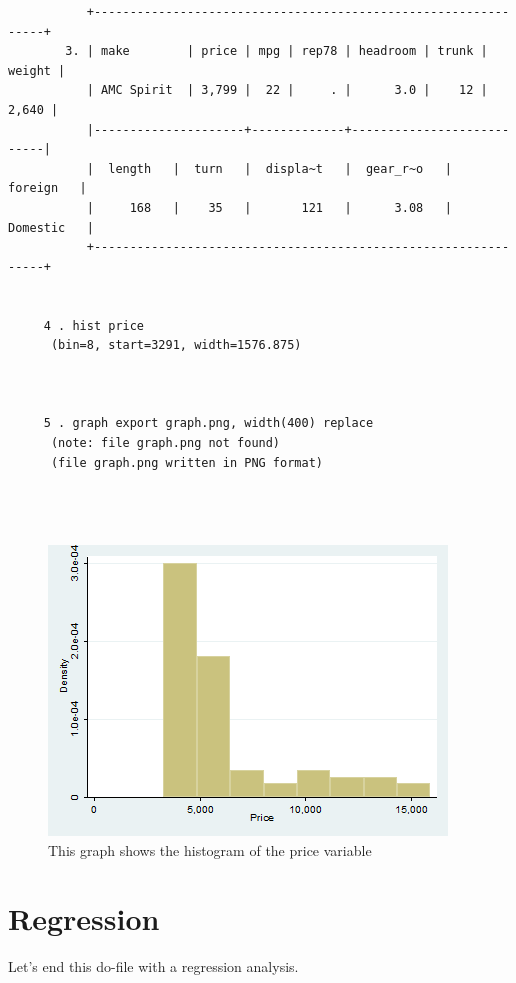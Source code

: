 \documentclass{article}
\begin{document}
\begin{verbatim}
           +---------------------------------------------------------------+
        3. | make        | price | mpg | rep78 | headroom | trunk | weight |
           | AMC Spirit  | 3,799 |  22 |     . |      3.0 |    12 |  2,640 |
           |---------------------+-------------+---------------------------|
           |  length   |  turn   |  displa~t   |  gear_r~o   |   foreign   |
           |     168   |    35   |       121   |      3.08   |  Domestic   |
           +---------------------------------------------------------------+
      

     4 . hist price
      (bin=8, start=3291, width=1576.875)
      
      

     5 . graph export graph.png, width(400) replace
      (note: file graph.png not found)
      (file graph.png written in PNG format)
      
      


\end{verbatim}



\begin{figure}[htbp]
\centering
\includegraphics{graph.png}
\caption{This graph shows the histogram of the price variable}
\end{figure}



\section{Regression}
Let's end this do-file with a regression analysis.
\end{document}
